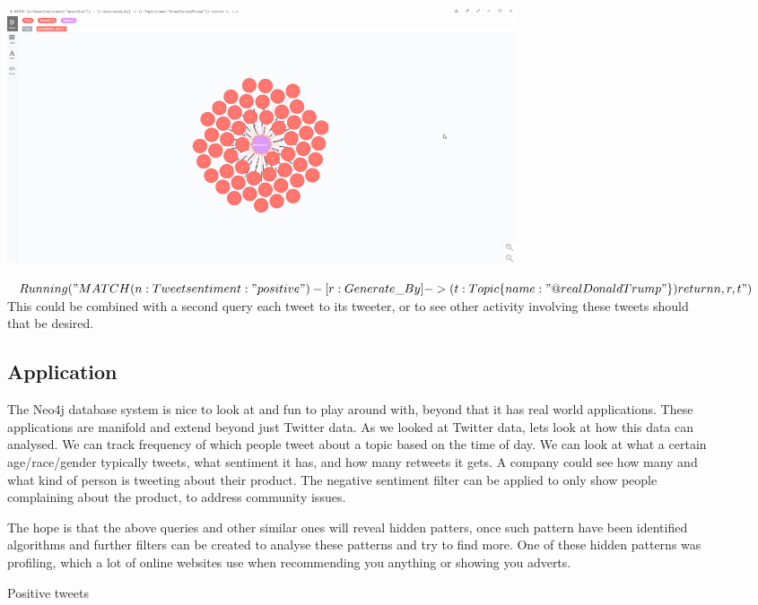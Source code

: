 \documentclass[11pt]{article}
\begin{document}
\begin{figure}
\includegraphics[width=15cm]{Positive}
\caption{Positive tweets} 
\label{fig: 6}

$Running ("MATCH (n:Tweet{sentiment:"positive"}) - [r:Generate\_By] -> (t:Topic\{name:"@realDonaldTrump"\}) return n,r,t")$
This could be combined with a second query each tweet to its tweeter, or to see other activity involving these tweets should that be desired.
\subsection{Application}
The Neo4j database system is nice to look at and fun to play around with, beyond that it has real world applications. These applications are manifold and extend beyond just Twitter data. As we looked at Twitter data, lets look at how this data can analysed. We can track frequency of which people tweet about a topic based on the time of day. We can look at what a certain age/race/gender typically tweets, what sentiment it has, and how many retweets it gets. A company could see how many and what kind of person is tweeting about their product. The negative sentiment filter can be applied to only show people complaining about the product, to address community issues.

The hope is that the above queries and other similar ones will reveal hidden patters, once such pattern have been identified algorithms and further filters can be created to analyse these patterns and try to find more. One of these hidden patterns was profiling, which a lot of online websites use when recommending you anything or showing you adverts. 
\end{figure}
\end{document}

